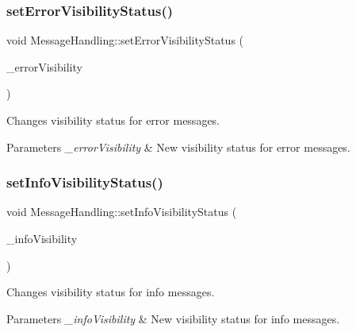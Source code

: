 \subsubsection{\texorpdfstring{set\+Error\+Visibility\+Status()}{setErrorVisibilityStatus()}}
{\footnotesize\ttfamily void Message\+Handling\+::set\+Error\+Visibility\+Status (\begin{DoxyParamCaption}\item[{\hyperlink{_types_8hpp_a36503475bb1fea0a7fd7087259ee63c1}{Visibility\+Status}}]{\+\_\+error\+Visibility }\end{DoxyParamCaption})\hspace{0.3cm}{\ttfamily [inline]}}

Changes visibility status for error messages. 
\begin{DoxyParams}{Parameters}
{\em \+\_\+error\+Visibility} & New visibility status for error messages. \\
\hline
\end{DoxyParams}
\mbox{\label{class_message_handling_ac1f2497e237ab552f408db52e7ba6359}} 
\subsubsection{\texorpdfstring{set\+Info\+Visibility\+Status()}{setInfoVisibilityStatus()}}
{\footnotesize\ttfamily void Message\+Handling\+::set\+Info\+Visibility\+Status (\begin{DoxyParamCaption}\item[{\hyperlink{_types_8hpp_a36503475bb1fea0a7fd7087259ee63c1}{Visibility\+Status}}]{\+\_\+info\+Visibility }\end{DoxyParamCaption})\hspace{0.3cm}{\ttfamily [inline]}}

Changes visibility status for info messages. 
\begin{DoxyParams}{Parameters}
{\em \+\_\+info\+Visibility} & New visibility status for info messages. \\
\hline
\end{DoxyParams}
\mbox{\label{class_message_handling_a91cf9df3e66b84d4fb6039b39de32390}} 
